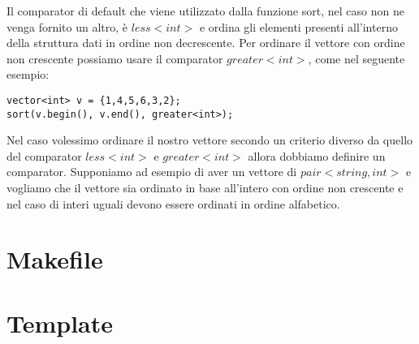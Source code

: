 \documentclass{article}
\begin{document}
Il comparator di default che viene utilizzato dalla funzione sort, nel caso non ne venga fornito un altro, è $less<int>$ e ordina gli elementi presenti all'interno della struttura dati in ordine non decrescente. Per ordinare il vettore con ordine non crescente possiamo usare il comparator $greater<int>$, come nel seguente esempio:

\begin{lstlisting}
vector<int> v = {1,4,5,6,3,2};
sort(v.begin(), v.end(), greater<int>);
\end{lstlisting}

Nel caso volessimo ordinare il nostro vettore secondo un criterio diverso da quello del comparator $less<int>$ e $greater<int>$ allora dobbiamo definire un comparator. Supponiamo ad esempio di aver un vettore di $pair<string, int>$ e vogliamo che il vettore sia ordinato in base all'intero con ordine non crescente e nel caso di interi uguali devono essere ordinati in ordine alfabetico.



\section{Makefile}



\section{Template}


\end{document}
